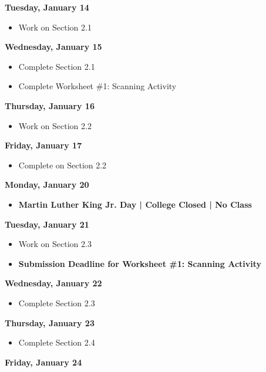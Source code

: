 \documentclass[11pt]{article}
\begin{document}
\textbf{Tuesday, January 14}

\begin{itemize}
\item Work on Section 2.1
\end{itemize}

\textbf{Wednesday, January 15}

\begin{itemize}
\item Complete Section 2.1
\item Complete Worksheet \#1: Scanning Activity
\end{itemize}

\textbf{Thursday, January 16}

\begin{itemize}
\item Work on Section 2.2
\end{itemize}

\textbf{Friday, January 17}

\begin{itemize}
\item Complete on Section 2.2
\end{itemize}

\textbf{Monday, January 20}

\begin{itemize}
\item \textbf{Martin Luther King Jr. Day | College Closed | No Class}
\end{itemize}

\textbf{Tuesday, January 21}

\begin{itemize}
\item Work on Section 2.3
\item \textbf{Submission Deadline for Worksheet \#1: Scanning Activity}
\end{itemize}

\textbf{Wednesday, January 22}

\begin{itemize}
\item Complete Section 2.3
\end{itemize}

\textbf{Thursday, January 23}

\begin{itemize}
\item Complete Section 2.4
\end{itemize}

\textbf{Friday, January 24}
\end{document}
